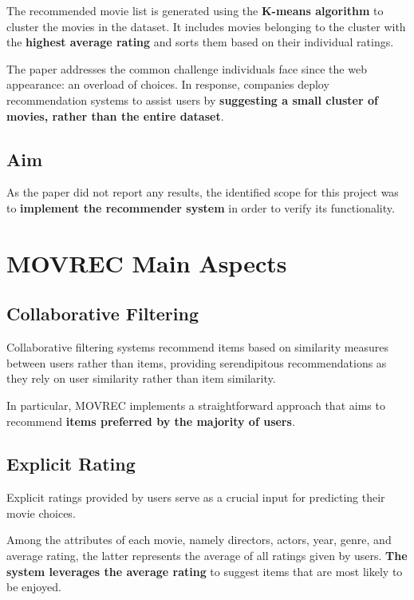 \documentclass{Configuration_Files/Template}
\begin{document}
The recommended movie list is generated using the \textbf{K-means algorithm} to cluster the movies in the dataset. It includes movies belonging to the cluster with the \textbf{highest average rating} and sorts them based on their individual ratings.

The paper addresses the common challenge individuals face since the web appearance: an overload of choices. In response, companies deploy recommendation systems to assist users by \textbf{suggesting a small cluster of movies, rather than the entire dataset}.

\section{Aim}

As the paper did not report any results, the identified scope for this project was to \textbf{implement the recommender system} in order to verify its functionality.


\chapter{MOVREC Main Aspects}

\section{Collaborative Filtering}

Collaborative filtering systems recommend items based on similarity measures between users rather than items, providing serendipitous recommendations as they rely on user similarity rather than item similarity.

In particular, MOVREC implements a straightforward approach that aims to recommend \textbf{items preferred by the majority of users}.

\section{Explicit Rating}

Explicit ratings provided by users serve as a crucial input for predicting their movie choices.

Among the attributes of each movie, namely directors, actors, year, genre, and average rating, the latter represents the average of all ratings given by users. \textbf{The system leverages the average rating} to suggest items that are most likely to be enjoyed.
\end{document}
